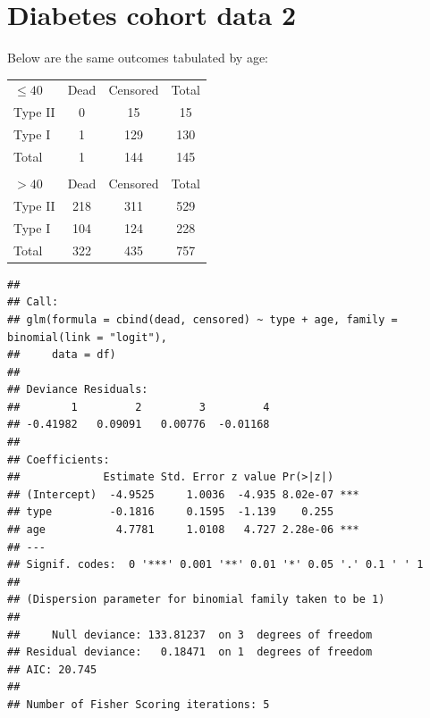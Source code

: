 \documentclass[landscape,twocolumn,letterpaper,9pt,reqno]{article}\usepackage[]{graphicx}\usepackage[]{color}
\newenvironment{knitrout}{}{} %
\begin{document}
\clearpage

\section{Diabetes cohort data 2}

Below are the same outcomes tabulated by age:

\begin{table}[h]
	\centering
	\begin{tabular}{lcc|c}
		$\leq 40$ & Dead &  Censored & Total\\
		Type II & 0 & 15 & 15 \\
		Type I & 1 & 129 & 130 \\
		\hline
		Total & 1 & 144 & 145 \\
		& & & \\
		$> 40$ & Dead &  Censored & Total\\
		Type II & 218 & 311 & 529 \\
		Type I & 104 & 124 & 228 \\
				\hline
		Total & 322 & 435 & 757 \\ 
	\end{tabular}
\end{table}


\begin{knitrout}
\color{fgcolor}
\begin{verbatim}
## 
## Call:
## glm(formula = cbind(dead, censored) ~ type + age, family = binomial(link = "logit"), 
##     data = df)
## 
## Deviance Residuals: 
##        1         2         3         4  
## -0.41982   0.09091   0.00776  -0.01168  
## 
## Coefficients:
##             Estimate Std. Error z value Pr(>|z|)    
## (Intercept)  -4.9525     1.0036  -4.935 8.02e-07 ***
## type         -0.1816     0.1595  -1.139    0.255    
## age           4.7781     1.0108   4.727 2.28e-06 ***
## ---
## Signif. codes:  0 '***' 0.001 '**' 0.01 '*' 0.05 '.' 0.1 ' ' 1
## 
## (Dispersion parameter for binomial family taken to be 1)
## 
##     Null deviance: 133.81237  on 3  degrees of freedom
## Residual deviance:   0.18471  on 1  degrees of freedom
## AIC: 20.745
## 
## Number of Fisher Scoring iterations: 5
\end{verbatim}

\end{knitrout}
\end{document}
